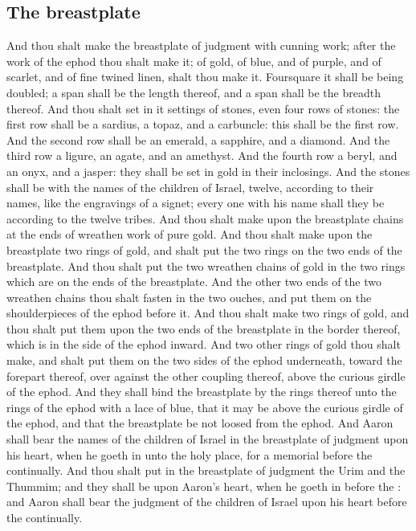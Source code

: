 \begin{biblechapter}
\section*{The breastplate}
\verse And thou shalt make the breastplate of judgment with cunning work; after the work of the ephod thou shalt make it; of gold, of blue, and of purple, and of scarlet, and of fine twined linen, shalt thou make it.
\verse Foursquare it shall be being doubled; a span shall be the length thereof, and a span shall be the breadth thereof.
\verse And thou shalt set in it settings of stones, even four rows of stones: the first row shall be a sardius, a topaz, and a carbuncle: this shall be the first row.
\verse And the second row shall be an emerald, a sapphire, and a diamond.
\verse And the third row a ligure, an agate, and an amethyst.
\verse And the fourth row a beryl, and an onyx, and a jasper: they shall be set in gold in their inclosings.
\verse And the stones shall be with the names of the children of Israel, twelve, according to their names, like the engravings of a signet; every one with his name shall they be according to the twelve tribes.
\verse And thou shalt make upon the breastplate chains at the ends of wreathen work of pure gold.
\verse And thou shalt make upon the breastplate two rings of gold, and shalt put the two rings on the two ends of the breastplate.
\verse And thou shalt put the two wreathen chains of gold in the two rings which are on the ends of the breastplate.
\verse And the other two ends of the two wreathen chains thou shalt fasten in the two ouches, and put them on the shoulderpieces of the ephod before it.
\verse And thou shalt make two rings of gold, and thou shalt put them upon the two ends of the breastplate in the border thereof, which is in the side of the ephod inward.
\verse And two other rings of gold thou shalt make, and shalt put them on the two sides of the ephod underneath, toward the forepart thereof, over against the other coupling thereof, above the curious girdle of the ephod.
\verse And they shall bind the breastplate by the rings thereof unto the rings of the ephod with a lace of blue, that it may be above the curious girdle of the ephod, and that the breastplate be not loosed from the ephod.
\verse And Aaron shall bear the names of the children of Israel in the breastplate of judgment upon his heart, when he goeth in unto the holy place, for a memorial before the \LORD continually.
\verse And thou shalt put in the breastplate of judgment the Urim and the Thummim; and they shall be upon Aaron's heart, when he goeth in before the \LORD: and Aaron shall bear the judgment of the children of Israel upon his heart before the \LORD continually.

\end{biblechapter}
